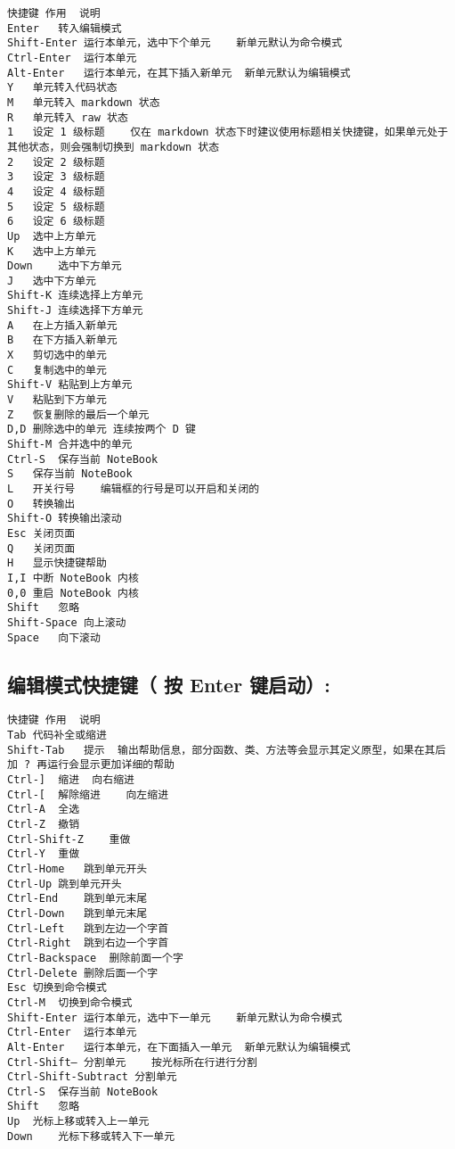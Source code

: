 \documentclass[11pt]{article}
\begin{document}
\begin{verbatim}
快捷键 作用  说明
Enter   转入编辑模式  
Shift-Enter 运行本单元，选中下个单元    新单元默认为命令模式
Ctrl-Enter  运行本单元   
Alt-Enter   运行本单元，在其下插入新单元  新单元默认为编辑模式
Y   单元转入代码状态    
M   单元转入 markdown 状态    
R   单元转入 raw 状态 
1   设定 1 级标题    仅在 markdown 状态下时建议使用标题相关快捷键，如果单元处于其他状态，则会强制切换到 markdown 状态
2   设定 2 级标题    
3   设定 3 级标题    
4   设定 4 级标题    
5   设定 5 级标题    
6   设定 6 级标题    
Up  选中上方单元  
K   选中上方单元  
Down    选中下方单元  
J   选中下方单元  
Shift-K 连续选择上方单元    
Shift-J 连续选择下方单元    
A   在上方插入新单元    
B   在下方插入新单元    
X   剪切选中的单元 
C   复制选中的单元 
Shift-V 粘贴到上方单元 
V   粘贴到下方单元 
Z   恢复删除的最后一个单元 
D,D 删除选中的单元 连续按两个 D 键
Shift-M 合并选中的单元 
Ctrl-S  保存当前 NoteBook   
S   保存当前 NoteBook   
L   开关行号    编辑框的行号是可以开启和关闭的
O   转换输出    
Shift-O 转换输出滚动  
Esc 关闭页面    
Q   关闭页面    
H   显示快捷键帮助 
I,I 中断 NoteBook 内核  
0,0 重启 NoteBook 内核  
Shift   忽略  
Shift-Space 向上滚动    
Space   向下滚动    
\end{verbatim}

\subsection{编辑模式快捷键（ 按 Enter
键启动）:}\label{ux7f16ux8f91ux6a21ux5f0fux5febux6377ux952e-ux6309-enter-ux952eux542fux52a8}

\begin{verbatim}
快捷键 作用  说明
Tab 代码补全或缩进 
Shift-Tab   提示  输出帮助信息，部分函数、类、方法等会显示其定义原型，如果在其后加 ? 再运行会显示更加详细的帮助
Ctrl-]  缩进  向右缩进
Ctrl-[  解除缩进    向左缩进
Ctrl-A  全选  
Ctrl-Z  撤销  
Ctrl-Shift-Z    重做  
Ctrl-Y  重做  
Ctrl-Home   跳到单元开头  
Ctrl-Up 跳到单元开头  
Ctrl-End    跳到单元末尾  
Ctrl-Down   跳到单元末尾  
Ctrl-Left   跳到左边一个字首    
Ctrl-Right  跳到右边一个字首    
Ctrl-Backspace  删除前面一个字 
Ctrl-Delete 删除后面一个字 
Esc 切换到命令模式 
Ctrl-M  切换到命令模式 
Shift-Enter 运行本单元，选中下一单元    新单元默认为命令模式
Ctrl-Enter  运行本单元   
Alt-Enter   运行本单元，在下面插入一单元  新单元默认为编辑模式
Ctrl-Shift– 分割单元    按光标所在行进行分割
Ctrl-Shift-Subtract 分割单元    
Ctrl-S  保存当前 NoteBook   
Shift   忽略  
Up  光标上移或转入上一单元 
Down    光标下移或转入下一单元 
\end{verbatim}
\end{document}
